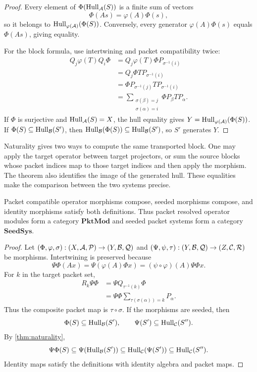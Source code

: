 \begin{proof}
Every element of $\Phi(\operatorname{Hull}_{\mathcal A}(S))$ is a finite sum of vectors
\[
\Phi(As)=\varphi(A)\Phi(s),
\]
so it belongs to $\operatorname{Hull}_{\varphi(\mathcal A)}(\Phi(S))$.  Conversely, every generator $\varphi(A)\Phi(s)$ equals $\Phi(As)$, giving equality.

For the block formula, use intertwining and packet compatibility twice:
\begin{align*}
Q_j\varphi(T)Q_i\Phi
&=Q_j\varphi(T)\Phi P_{\sigma^{-1}(i)}\\
&=Q_j\Phi TP_{\sigma^{-1}(i)}\\
&=\Phi P_{\sigma^{-1}(j)}TP_{\sigma^{-1}(i)}\\
&=\sum_{\substack{\sigma(\beta)=j\\\sigma(\alpha)=i}}
\Phi P_\beta TP_\alpha.
\end{align*}
If $\Phi$ is surjective and $\operatorname{Hull}_{\mathcal A}(S)=X$, the hull equality gives $Y=\operatorname{Hull}_{\varphi(\mathcal A)}(\Phi(S))$.  If $\Phi(S)\subseteq\operatorname{Hull}_{\mathcal B}(S')$, then $\operatorname{Hull}_{\mathcal B}(\Phi(S))\subseteq\operatorname{Hull}_{\mathcal B}(S')$, so $S'$ generates $Y$.
\end{proof}

\begin{keyidea}
Naturality gives two ways to compute the same transported block.  One may apply the target operator between target projectors, or sum the source blocks whose packet indices map to those target indices and then apply the morphism.  The theorem also identifies the image of the generated hull.  These equalities make the comparison between the two systems precise.
\end{keyidea}


\begin{proposition}
\label{prop:seed-category}
Packet compatible operator morphisms compose, seeded morphisms compose, and identity morphisms satisfy both definitions.  Thus packet resolved operator modules form a category $\mathbf{PktMod}$ and seeded packet systems form a category $\mathbf{SeedSys}$.
\end{proposition}

\begin{proof}
Let $(\Phi,\varphi,\sigma):(X,\mathcal A,\mathcal P)\to(Y,\mathcal B,\mathcal Q)$ and $(\Psi,\psi,\tau):(Y,\mathcal B,\mathcal Q)\to(Z,\mathcal C,\mathcal R)$ be morphisms.  Intertwining is preserved because
\[
\Psi\Phi(Ax)
=
\Psi(\varphi(A)\Phi x)
=
(\psi\circ\varphi)(A)\Psi\Phi x.
\]
For $k$ in the target packet set,
\begin{align*}
R_k\Psi\Phi
&=\Psi Q_{\tau^{-1}(k)}\Phi\\
&=\Psi\Phi
\sum_{\tau(\sigma(\alpha))=k}P_\alpha.
\end{align*}
Thus the composite packet map is $\tau\circ\sigma$.  If the morphisms are seeded, then
\[
\Phi(S)\subseteq\operatorname{Hull}_{\mathcal B}(S'),
\qquad
\Psi(S')\subseteq\operatorname{Hull}_{\mathcal C}(S'').
\]
By \cref{thm:naturality},
\[
\Psi\Phi(S)
\subseteq
\Psi(\operatorname{Hull}_{\mathcal B}(S'))
\subseteq
\operatorname{Hull}_{\mathcal C}(\Psi(S'))
\subseteq
\operatorname{Hull}_{\mathcal C}(S'').
\]
Identity maps satisfy the definitions with identity algebra and packet maps.
\end{proof}

